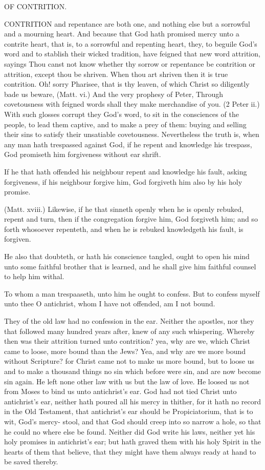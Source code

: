OF CONTRITION. 

CONTRITION and repentance are both one, and nothing
else but a sorrowful and a mourning heart. And 
because that God hath promised mercy unto a contrite heart, 
that is, to a sorrowful and repenting heart, they, to beguile 
God's word and to stablish their wicked tradition, have 
feigned that new word attrition, sayings Thou canst not 
know whether thy sorrow or repentance be contrition or attrition,
except thou be shriven. When thou art shriven then 
it is true contrition. Oh! sorry Pharisee, that is thy leaven, 
of which Christ so diligently bade us beware, (Matt. vi.) 
And the very prophesy of Peter, Through covetousness 
with feigned words shall they make merchandise of you. 
(2 Peter ii.) With such glosses corrupt they God's word, to 
sit in the consciences of the people, to lead them captive, 
and to make a prey of them: buying and selling their sins 
to satisfy their unsatiable covetousness. Nevertheless the 
truth is, when any man hath trespassed against God, if he 
repent and knowledge his trespass, God promiseth him forgiveness
without ear shrift. 

If he that hath offended his neighbour repent and 
knowledge his fault, asking forgiveness, if his neighbour 
forgive him, God forgiveth him also by his holy promise. 


(Matt. xviii.) Likewise, if he that sinneth openly when he is 
openly rebuked, repent and turn, then if the congregation 
forgive him, God forgiveth him; and so forth whosoever 
repenteth, and when he is rebuked knowledgeth his fault, is 
forgiven.

He also that doubteth, or hath his conscience tangled, 
ought to open his mind unto some faithful brother that is 
learned, and he shall give him faithful counsel to help him 
withal.

To whom a man trespaaseth, unto him he ought to confess.
But to confess myself unto thee O antichrist, whom I 
have not offended, am I not bound. 

They of the old law had no confession in the ear. Neither
the apostles, nor they that followed many hundred years 
after, knew of any such whispering. Whereby then was their 
attrition turned unto contrition? yea, why are we, which 
Christ came to loose, more bound than the Jews? Yea, 
and why are we more bound without Scripture? for Christ 
came not to make us more bound, but to loose us and to 
make a thousand things no sin which before were sin, and 
are now become sin again. He left none other law with us 
but the law of love. He loosed us not from Moses to bind 
us unto antichrist's ear. God had not tied Christ unto 
antichrist's ear, neither hath poured all his mercy in thither, 
for it hath no record in the Old Testament, that antichrist's 
ear should be Propiciatorium, that is to wit, God's mercy- 
stool, and that God should creep into so narrow a hole, so 
that he could no where else be found. Neither did 
God write his laws, neither yet his holy promises in 
antichrist's ear; but hath graved them with his holy Spirit 
in the hearts of them that believe, that they might have 
them always ready at hand to be saved thereby. 


